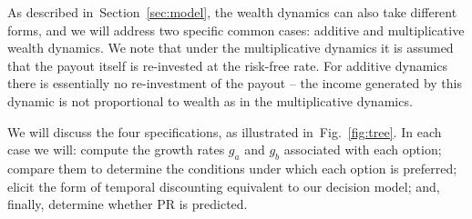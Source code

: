 \documentclass[11pt]{article}
\newcommand{\Sref}[1]{Section~\ref{sec:#1}}
\newcommand{\ie}{{\it i.e.}\ }
\newcommand{\fref}[1]{Fig.~\ref{fig:#1}}
\newcommand{\Dt}{\Delta t}
\numberwithin{equation}{section}
\begin{document}




As described in~\Sref{model}, the wealth dynamics can also take different forms, and we will address two specific common cases: additive and multiplicative wealth dynamics. We note that under the multiplicative dynamics it is assumed that the payout itself is re-invested at the risk-free rate. For additive dynamics there is essentially no re-investment of the payout -- the income generated by this dynamic is not proportional to wealth as in the multiplicative dynamics.

We will discuss the four specifications, as illustrated in~\fref{tree}. In each case we will: compute the growth rates $g_a$ and $g_b$ associated with each option; compare them to determine the conditions under which each option is preferred; elicit the form of temporal discounting equivalent to our decision model; and, finally, determine whether PR is predicted.
\end{document}
